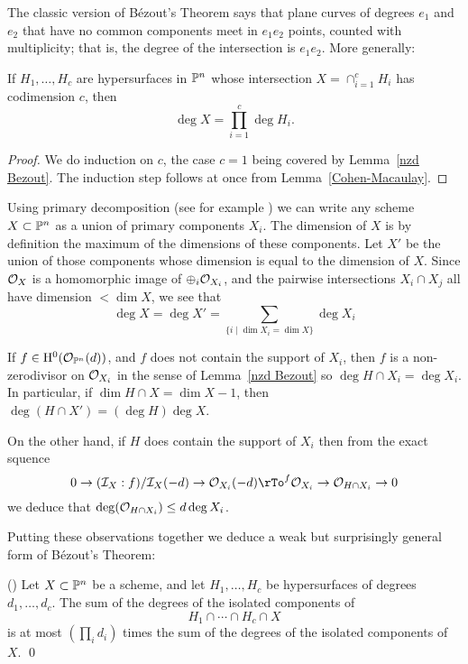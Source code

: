 The classic version of B\'ezout's Theorem says that plane curves of degrees $e_{1}$ and $e_{2}$ that
have no common components meet in $e_{1}e_{2}$ points, counted with multiplicity; that is, the degree of the 
intersection is $e_{1}e_{2}$.
More generally:

\begin{corollary}\label{classic Bezout}
 If $H_{1}, \dots, H_{c}$ are hypersurfaces in $\PP^{n}$ whose intersection
 $X = \cap_{i=1}^{c}H_{i}$ has codimension $c$, then 
 $$
 \deg X = \prod_{i=1}^{c}\deg H_{i}.
 $$
\end{corollary}
\begin{proof}
We do induction on $c$, the case $c=1$ being covered by Lemma~\ref{nzd Bezout}. The induction step
follows at once from Lemma~\ref{Cohen-Macaulay}.
\end{proof}


Using primary decomposition (see for example \cite[Section II.3.3]{GeomSchemes}) we can write any
scheme $X\subset \PP^{n}$ as a union of primary components $X_{i}$. The dimension of $X$ is
by definition the maximum of the dimensions of these components. Let $X'$ be the union of those
components whose dimension is equal to the dimension of $X$. Since $\cO_{X}$ is a homomorphic image of
$\oplus_{i}\cO_{X_{i}}$, and the pairwise intersections $X_{i}\cap X_{j}$ all have dimension $<\dim X$, 
we see that 
$$
\deg X = \deg X' = \sum_{\{i\mid \dim X_{i} = \dim X\}}\deg X_{i}
$$

If $f \in \HH^{0}(\cO_{\PP^{n}}(d))$, and $f$ does not contain the support of $X_{i}$, then
$f$ is a non-zerodivisor on $\cO_{X_{i}}$ in the sense of
Lemma~\ref{nzd Bezout} so $\deg H\cap X_{i} = \deg X_{i}$. 
In particular, if $\dim H\cap X = \dim X -1$, then
$\deg(H\cap X') = (\deg H)\deg X$. 

On the other hand, if $H$ does contain the
support of $X_{i}$ then from the exact squence
$$
0\to (\cI_{X}:f)/\cI_{X}(-d) \to \cO_{X_{i}}(-d) \rTo^{f} \cO_{X_{i}} \to \cO_{H\cap X_{i}} \to 0
$$
we deduce that $\deg (\cO_{H\cap X_{i}}) \leq d\deg X_{i}$.

Putting these observations together we deduce a weak but surprisingly general form of B\'ezout's Theorem:

\begin{proposition}(\cite[Exericse 8.4.6]{Fulton})\label {weak Bezout}
Let $X\subset \PP^{n}$ be a scheme, and let $H_{1}, \dots, H_{c}$ be hypersurfaces of degrees $d_{1}, \dots, d_{c}$.
The sum of the degrees of the isolated components of 
$$
H_{1}\cap\cdots\cap H_{c}\cap X
$$
is at most $(\prod_{i}d_{i})$ times the sum of the degrees of the isolated components of $X$. \qed
\end{proposition}


